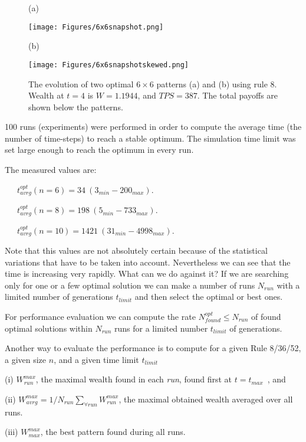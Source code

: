 \documentclass[10pt,a4paper]{article}  %
\begin{document}
          
\begin{figure}[H] 
\centering
(a)

\texttt{[image: Figures/6x6snapshot.png]}
	
(b)

\texttt{[image: Figures/6x6snapshotskewed.png]}	
\caption{
 The evolution of two  
optimal $6 \times 6$ patterns (a) and (b) using rule 8.  
Wealth at $t=4$ is $W= 1.1944$, and $TPS=387$.
The total payoffs are shown below the patterns. 
}
\label{6x6snapshot}
\end{figure}

100 runs (experiments) were performed in order to compute the average time (the number of time-steps)
to reach a stable optimum. The simulation time limit was set large enough to reach the optimum
in every run. 

The measured values are:

~~~$t_{avrg}^{opt}(n=6) = 34~(3_{min}-200_{max})$.

~~~$t_{avrg}^{opt}(n=8) = 198~(5_{min}-733_{max})$.

~~~$t_{avrg}^{opt}(n=10) = 1421~(31_{min}-4998_{max})$.

Note that this values are not absolutely certain because of the statistical variations that 
have to be taken into account. %
Nevertheless we can see that the time is increasing very rapidly.
What can we do against it?
If we are searching only for one or a few optimal solution we can 
make a number of runs $N_{run}$ with a limited number of generations $t_{limit}$ and then select the 
optimal or best ones. 

For performance evaluation we can compute the rate 
$N^{opt}_{found} \leq N_{run}$ of found optimal solutions within $N_{run}$ runs for a limited number $t_{limit}$
of generations. 

Another way to evaluate the performance is to compute for a given Rule 8/36/52, a given size $n$, 
and a given time limit  $t_{limit}$  

(i) $W^{max}_{run}$,  the maximal wealth 
 found in each \textit{run}, 
found first at $t=t_{max}$~, and 
  
 (ii)  $W^{max}_{avrg}= 1/N_{run}\sum_{\forall run}W^{max}_{run}$, the  maximal obtained wealth
averaged over all runs. 

(iii) $W^{max}_{max}$, the best pattern found during all runs.  
\end{document}
